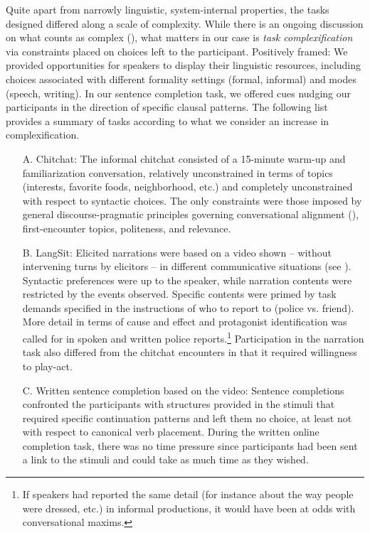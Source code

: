 \documentclass[output=paper]{langscibook}
\begin{document}
Quite apart from narrowly linguistic, system-internal properties, the tasks designed differed along a scale of complexity. While there is an ongoing discussion on what counts as complex (\citealt{HousenKuikenVedder2012}), what matters in our case is \textit{task complexification} via constraints placed on choices left to the participant. Positively framed: We provided opportunities for speakers to display their linguistic resources, including choices associated with different formality settings (formal, informal) and modes (speech, writing). In our sentence completion task, we offered cues nudging our participants in the direction of specific clausal patterns. The following list provides a summary of tasks according to what we consider an increase in complexification.

\begin{itemize}
\item[A.]
Chitchat: The informal chitchat consisted of a 15-minute warm-up and familiarization conversation, relatively unconstrained in terms of topics (interests, favorite foods, neighborhood, etc.) and completely unconstrained with respect to syntactic choices. The only constraints were those imposed by general discourse-pragmatic principles governing conversational alignment (\citealt{PickeringGarrod2004}), first\hyp encounter topics, politeness, and relevance.
\item[B.] LangSit: Elicited narrations were based on a video shown – without intervening turns by elicitors – in different communicative situations (see ). Syntactic preferences were up to the speaker, while narration contents were restricted by the events observed. Specific contents were primed by task demands specified in the instructions of who to report to (police vs. friend). More detail in terms of cause and effect and protagonist identification was called for in spoken and written police reports.\footnote{If speakers had reported the same detail (for instance about the way people were dressed, etc.) in informal productions, it would have been at odds with conversational maxims.} Participation in the narration task also differed from the chitchat encounters in that it required willingness to play-act.
\item[C.] Written sentence completion based on the video: Sentence completions confronted the participants with structures provided in the stimuli that required specific continuation patterns and left them no choice, at least not with respect to canonical verb placement. During the written online completion task, there was no time pressure since participants had been sent a link to the stimuli and could take as much time as they wished.

\end{itemize}
\end{document}
